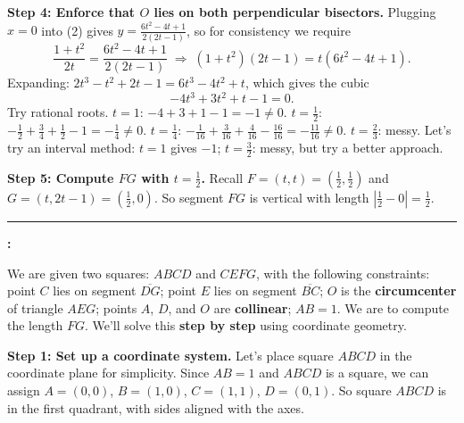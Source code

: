 \begin{ReasoningBox}[title={Case Study: Math Reasoning (Smaller \& Larger Setting)}, breakable]
\textbf{Step 4: Enforce that $O$ lies on both perpendicular bisectors.} Plugging $x = 0$ into (2) gives $y = \frac{6t^2 - 4t + 1}{2(2t-1)}$, so for consistency we require
\[
\frac{1 + t^2}{2t} = \frac{6t^2 - 4t + 1}{2(2t-1)}
\;\Longrightarrow\;
(1 + t^2)(2t - 1) = t(6t^2 - 4t + 1).
\]
Expanding: $2t^3 - t^2 + 2t - 1 = 6t^3 - 4t^2 + t$, which gives the cubic
\[
-4t^3 + 3t^2 + t - 1 = 0.
\]
Try rational roots. $t = 1$: $-4 + 3 + 1 - 1 = -1 \neq 0$. $t = \tfrac12$: $-\tfrac12 + \tfrac34 + \tfrac12 - 1 = -\tfrac14 \neq 0$. $t = \tfrac14$: $-\tfrac{1}{16} + \tfrac{3}{16} + \tfrac{4}{16} - \tfrac{16}{16} = -\tfrac{11}{16} \neq 0$. $t = \tfrac23$: messy. Let's try an interval method: $t = 1$ gives $-1$; $t = \tfrac32$: messy, but try a better approach.


\textbf{Step 5: Compute $FG$ with $t = \tfrac12$.} Recall $F = (t,t) = (\tfrac12, \tfrac12)$ and $G = (t, 2t-1) = (\tfrac12, 0)$. So segment $FG$ is vertical with length $|\tfrac12 - 0| = \tfrac12$.

 \quad {}

\medskip
\noindent\rule{\linewidth}{0.4pt}
\medskip

\textbf{\ours:}

We are given two squares: $ABCD$ and $CEFG$, with the following constraints: point $C$ lies on segment $\overline{DG}$; point $E$ lies on segment $\overline{BC}$; $O$ is the \textbf{circumcenter} of triangle $AEG$; points $A$, $D$, and $O$ are \textbf{collinear}; $AB = 1$. We are to compute the length $FG$. We'll solve this \textbf{step by step} using coordinate geometry.

\textbf{Step 1: Set up a coordinate system.} Let's place square $ABCD$ in the coordinate plane for simplicity. Since $AB = 1$ and $ABCD$ is a square, we can assign $A = (0, 0)$, $B = (1, 0)$, $C = (1, 1)$, $D = (0, 1)$. So square $ABCD$ is in the first quadrant, with sides aligned with the axes.


\end{ReasoningBox}
